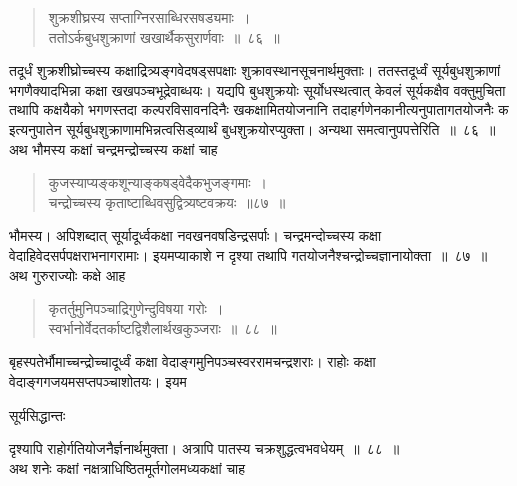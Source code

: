 \documentclass[11pt, openany]{book}
\begin{document}
%

 \begin{quote}
{\ssi शुक्रशीघ्रस्य सप्ताग्निरसाब्धिरसषड्यमाः~।\\
ततोऽर्कबुधशुक्राणां खखार्थैकसुरार्णवाः~॥~८६~॥}
\end{quote}
 तदूर्धं शुक्रशीघ्रोच्चस्य कक्षाद्रित्र्यङ्गवेदषड्सपक्षाः शुक्रावस्थानसूचनार्थमुक्ताः। ततस्तदूर्ध्वं सूर्यबुधशुक्राणां भगणैक्यादभिन्ना कक्षा खखपञ्चभूद्रेवाब्धयः। यद्यपि बुधशुक्रयोः सूर्योधस्थत्वात् केवलं सूर्यकक्षैव वक्तुमुचिता तथापि कक्षयैको भगणस्तदा कल्परविसावनदिनैः खकक्षामितयोजनानि तदाहर्गणेनकानीत्यनुपातागतयोजनैः क इत्यनुपातेन सूर्यबुधशुक्राणामभिन्नत्वसिड्व्यार्थं बुधशुक्रयोरप्युक्ता। अन्यथा समत्वानुपपत्तेरिति~॥~८६~॥ \\
\noindent अथ भौमस्य कक्षां चन्द्रमन्द्रोच्चस्य कक्षां चाह \textendash

 \begin{quote}
{\ssi कुजस्याप्यङ्कशून्याङ्कषड्वेदैकभुजङ्गमाः~।\\
चन्द्रोच्चस्य कृताष्टाब्धिवसुद्वित्र्यष्टवक्रयः~॥८७~॥}
\end{quote}

 भौमस्य। अपिशब्दात् सूर्यादूर्ध्वकक्षा नवखनवषडिन्द्रसर्पाः। चन्द्रमन्दोच्चस्य कक्षा वेदाहिवेदसर्पपक्षराभनागरामाः। इयमप्याकाशे न दृश्या तथापि गतयोजनैश्चन्द्रोच्चज्ञानायोक्ता~॥~८७~॥\\
\noindent अथ गुरुराज्योः कक्षे आह \textendash


  \begin{quote}
{\ssi  कृतर्तुमुनिपञ्चाद्रिगुणेन्दुविषया गरोः~।\\
स्वर्भानोर्वेदतर्काष्टद्विशैलार्थखकुञ्जराः~॥~८८~॥}
\end{quote}
 बृहस्पतेर्भौमाच्चन्द्रोच्चादूर्ध्वं कक्षा वेदाङ्गमुनिपञ्चस्वररामचन्द्रशराः। राहोः कक्षा वेदाङ्गगजयमसप्तपञ्चाशोतयः। इयम \textendash
%

\newpage


 \hspace{4cm} सूर्यसिद्धान्तः
\vspace{1cm}


\noindent दृश्यापि राहोर्गतियोजनैर्ज्ञनार्थमुक्ता। अत्रापि पातस्य चक्रशुद्धत्वभवधेयम्~॥~८८~॥ \\
\noindent अथ शनेः कक्षां नक्षत्राधिष्ठितमूर्तगोलमध्यकक्षां चाह \textendash
\end{document}

